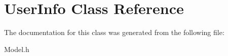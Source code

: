 \hypertarget{classUserInfo}{}\section{User\+Info Class Reference}
\label{classUserInfo}


The documentation for this class was generated from the following file\+:\begin{DoxyCompactItemize}
\item 
Model.\+h\end{DoxyCompactItemize}
